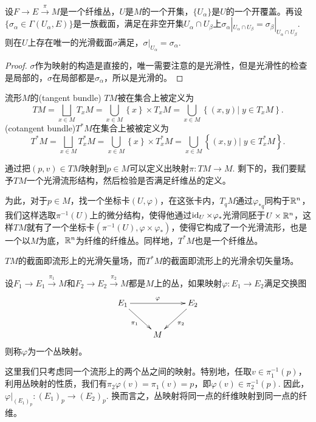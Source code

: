 \begin{lem}[局部化原理]\label{localprin}
设$F\to E\xrightarrow{\pi} M$是一个纤维丛，$U$是$M$的一个开集，$\{U_\alpha\}$是$U$的一个开覆盖。再设$\{\sigma_\alpha\in \Gamma(U_\alpha,E)\}$是一族截面，满足在非空开集$U_\alpha\cap U_\beta$上$\sigma_\alpha|_{U_\alpha\cap U_\beta}=\sigma_\beta|_{U_\alpha\cap U_\beta}$. 则在$U$上存在唯一的光滑截面$\sigma$满足，$\sigma|_{U_\alpha}=\sigma_\alpha$.
\end{lem}

\begin{proof}
$\sigma$作为映射的构造是直接的，唯一需要注意的是光滑性，但是光滑性的检查是局部的，$\sigma$在局部都是$\sigma_\alpha$，所以是光滑的。
\end{proof}

\begin{para}[切丛与余切丛]
流形$M$的(tangent bundle) $TM$被在集合上被定义为
\[
	TM=\bigsqcup_{x\in M}T_xM=\bigcup_{x\in M} \left\{x\right\}\times T_xM=\bigcup_{x\in M} \left\{(x, y)\vert\; y\in T_xM\right\}.
\]
(cotangent bundle)$T^*M$在集合上被被定义为
\[
	T^*M=\bigsqcup_{x\in M}T^*_xM=\bigcup_{x\in M} \left\{x\right\}\times T^*_xM=\bigcup_{x\in M} \left\{(x, y)\vert\; y\in T_x^*M\right\}.
\]

通过把$(p,v)\in TM$映射到$p\in M$可以定义出映射$\pi: TM\to M$. 剩下的，我们要赋予$TM$一个光滑流形结构，然后检验是否满足纤维丛的定义。

为此，对于$p\in M$，找一个坐标卡$(U,\varphi)$，在这张卡内，$T_qM$通过$\varphi_{*q}$同构于$\mathbb{R}^n$，我们这样选取$\pi^{-1}(U)$上的微分结构，使得他通过$\operatorname{id}_U\times \varphi_*$光滑同胚于$U \times \mathbb{R}^n$，这样$TM$就有了一个坐标卡$(\pi^{-1}(U),\varphi\times \varphi_*)$，使得它构成了一个光滑流形，也是一个以$M$为底，$\mathbb{R}^n$为纤维的纤维丛。同样地，$T^*M$也是一个纤维丛。
\end{para}

$TM$的截面即流形上的光滑矢量场，而$T^*M$的截面即流形上的光滑余切矢量场。

\begin{para}[丛映射]
设$F_1\to E_1\xrightarrow{\pi_1} M$和$F_2\to E_2\xrightarrow{\pi_2} M$都是$M$上的丛，如果映射$\varphi:E_1\to E_2$满足交换图
\[
	\xymatrix{
	E_1\ar[rr]^\varphi\ar[rd]_{\pi_1}&&E_2\ar[ld]^{\pi_2}\\
	&M&
	}
\]
则称$\varphi$为一个丛映射。
\end{para}

这里我们只考虑同一个流形上的两个丛之间的映射。特别地，任取$v\in \pi_1^{-1}(p)$，利用丛映射的性质，我们有$\pi_2\varphi(v)=\pi_1(v)=p$，即$\varphi(v)\in \pi_2^{-1}(p)$. 因此，$\varphi|_{(E_1)_p}:(E_1)_p\to (E_2)_p$. 换而言之，丛映射将同一点的纤维映射到同一点的纤维。

